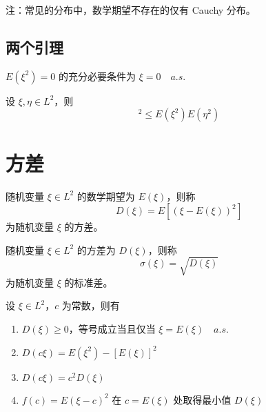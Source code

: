 \documentclass[12pt,a4paper]{amsart}
\begin{document}
注：常见的分布中，数学期望不存在的仅有 Cauchy 分布。

\subsection{两个引理}

\begin{proposition}
    $E(\xi^2)=0$ 的充分必要条件为 $\xi = 0 \quad a.s.$
\end{proposition}

\begin{proposition}
    设 $\xi, \eta \in L^2$，则
    \begin{equation}
        [E(\xi\eta)]^2 \leq E(\xi^2)E(\eta^2)
    \end{equation}
\end{proposition}


\section{方差}

\begin{definition}[方差]
    随机变量 $\xi\in L^2$ 的数学期望为 $E(\xi)$，则称
    \begin{equation}
        D(\xi) = E[(\xi - E(\xi))^2]
    \end{equation}
    为随机变量 $\xi$ 的方差。
\end{definition}

\begin{definition}[标准差]
    随机变量 $\xi\in L^2$ 的方差为 $D(\xi)$，则称
    \begin{equation}
        \sigma(\xi) = \sqrt{D(\xi)}
    \end{equation}
    为随机变量 $\xi$ 的标准差。
\end{definition}

\begin{proposition}[方差的基本性质]
    设 $\xi \in L^2$，$c$ 为常数，则有
    \begin{enumerate}
        \item $D(\xi) \geq 0$，等号成立当且仅当 $\xi = E(\xi) \quad a.s.$
        \item $D(c\xi) = E(\xi^2) - [E(\xi)]^2$
        \item $D(c\xi) = c^2 D(\xi)$
        \item $f(c) = E(\xi-c)^2$ 在 $c = E(\xi)$ 处取得最小值 $D(\xi)$
    \end{enumerate}
\end{proposition}
\end{document}
